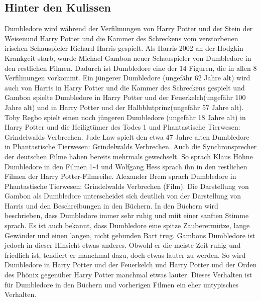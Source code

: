 \documentclass[a4paper, 10pt]{article}
\begin{document}
\subsection*{\Large Hinter den Kulissen}
Dumbledore wird während der Verfilmungen von Harry Potter und der Stein der Weisenund Harry Potter und die Kammer des Schreckens vom verstorbenen irischen Schauspieler Richard Harris gespielt. Als Harris 2002 an der Hodgkin-Krankgeit starb, wurde Michael Gambon neuer Schauspieler von Dumbledore in den restlichen Filmen. Dadurch ist Dumbledore eine der 14 Figuren, die in allen 8 Verfilmungen vorkommt.
\vspace{10pt}
\newline
{}  
Ein jüngerer Dumbledore (ungefähr 62 Jahre alt) wird auch von Harris in Harry Potter und die Kammer des Schreckens gespielt und Gambon spielte Dumbledore in Harry Potter und der Feuerkelch(ungefähr 100 Jahre alt) und in Harry Potter und der Halbblutprinz(ungefähr 57 Jahre alt). Toby Regbo spielt einen noch jüngeren Dumbledore (ungefähr 18 Jahre alt) in Harry Potter und die Heiligtümer des Todes 1 und Phantastische Tierwesen: Grindelwalds Verbrechen.
\vspace{10pt}
\newline
{}  
Jude Law spielt den etwa 47 Jahre alten Dumbledore in Phantastische Tierwesen: Grindelwalds Verbrechen.
Auch die Synchronsprecher der deutschen Filme haben bereits mehrmals gewechselt. So sprach Klaus Höhne Dumbledore in den Filmen 1-4 und Wolfgang Hess sprach ihn in den restlichen Filmen der Harry Potter-Filmreihe. Alexander Brem sprach Dumbledore in Phantastische Tierwesen: Grindelwalds Verbrechen (Film).
Die Darstellung von Gambon als Dumbledore unterscheidet sich deutlich von der Darstellung von Harris und den Beschreibungen in den Büchern. In den Büchern wird beschrieben, dass Dumbledore immer sehr ruhig und miit einer sanften Stimme sprach. Es ist auch bekannt, dass Dumbledore eine spitze Zauberermütze, lange Gewänder und einen langen, nicht gebunden Bart trug. Gambons Dumbledore ist jedoch in dieser Hinsicht etwas anderes. Obwohl er die meiste Zeit ruhig und friedlich ist, tendiert er manchmal dazu, doch etwas lauter zu werden. So wird Dumbledore in Harry Potter und der Feuerkelch und Harry Potter und der Orden des Phönix gegenüber Harry Potter manchmal etwas lauter. Dieses Verhalten ist für Dumbledore in den Büchern und vorherigen Filmen ein eher untypisches Verhalten.
\vspace{10pt}
\newline
\end{document}
